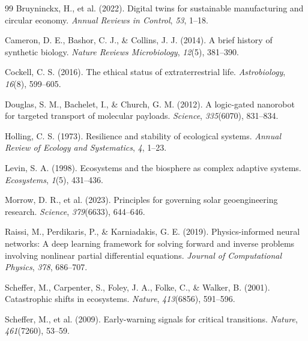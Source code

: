 \documentclass[11pt,a4paper]{article}
\begin{document}
\begin{thebibliography}{99}
Bruyninckx, H., et al. (2022). Digital twins for sustainable manufacturing and circular economy. \textit{Annual Reviews in Control}, \textit{53}, 1--18.

Cameron, D. E., Bashor, C. J., \& Collins, J. J. (2014). A brief history of synthetic biology. \textit{Nature Reviews Microbiology}, \textit{12}(5), 381--390.

Cockell, C. S. (2016). The ethical status of extraterrestrial life. \textit{Astrobiology}, \textit{16}(8), 599--605.

Douglas, S. M., Bachelet, I., \& Church, G. M. (2012). A logic-gated nanorobot for targeted transport of molecular payloads. \textit{Science}, \textit{335}(6070), 831--834.

Holling, C. S. (1973). Resilience and stability of ecological systems. \textit{Annual Review of Ecology and Systematics}, \textit{4}, 1--23.

Levin, S. A. (1998). Ecosystems and the biosphere as complex adaptive systems. \textit{Ecosystems}, \textit{1}(5), 431--436.

Morrow, D. R., et al. (2023). Principles for governing solar geoengineering research. \textit{Science}, \textit{379}(6633), 644--646.

Raissi, M., Perdikaris, P., \& Karniadakis, G. E. (2019). Physics-informed neural networks: A deep learning framework for solving forward and inverse problems involving nonlinear partial differential equations. \textit{Journal of Computational Physics}, \textit{378}, 686--707.

Scheffer, M., Carpenter, S., Foley, J. A., Folke, C., \& Walker, B. (2001). Catastrophic shifts in ecosystems. \textit{Nature}, \textit{413}(6856), 591--596.

Scheffer, M., et al. (2009). Early-warning signals for critical transitions. \textit{Nature}, \textit{461}(7260), 53--59.

\end{thebibliography}
\end{document}
